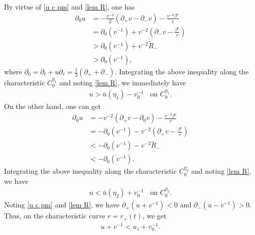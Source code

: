 \documentclass[10pt,leqno]{amsart}
\numberwithin{equation}{section}
\begin{document}
	By virtue of \eqref{u c pm} and \eqref{lem R}, one has
	\begin{equation} 
		\begin{aligned}
			\partial_{0} u &= - \frac{v^{-2}}{2}(\partial_{+} v - \partial_{-} v) - \frac{v^{-2} \mathcal{F}}{r}  \\
			& = \partial_{0} (v^{-1}) + v^{-2}\left( \partial_{-} v - \frac{\mathcal{F}}{r} \right) \\
			& > \partial_{0} (v^{-1}) + v^{-2} \tilde{R}_- \\
			& > \partial_{0} (v^{-1}),
		\end{aligned}
	\end{equation}	
	where $\partial_{0}  = \partial_{t} + u \partial_{r} = \frac{1}{2} (\partial_{+} + \partial_{-} )$. Integrating the above inequality along the characteristic $C_{0}^{\eta_1}$ and noting \eqref{lem R}, we immediately have
	\begin{equation} \label{3.12}
		\begin{aligned}
			u > \bar{u} (\eta_1) - v_{0}^{-1} \ \ \ \ \text{on } C_{0}^{\eta_1}.
		\end{aligned}
	\end{equation}	
	On the other hand, one can get
	\begin{equation} 
		\begin{aligned}
			\partial_{0} u & = - v^{-2}(\partial_{+} v - \partial_{0} v) -\frac{ v^{-2}\mathcal{F}}{r} \\
			& = -\partial_{0} (v^{-1}) - v^{-2}\left( \partial_{+} v - \frac{\mathcal{F}}{r} \right) \\
			& < - \partial_{0} (v^{-1}) - v^{-2} \tilde{R}_- \\
			& < - \partial_{0} (v^{-1}).
		\end{aligned}
	\end{equation}	
	Integrating the above inequality along the characteristic $C_{0}^{\eta_2}$ and noting \eqref{lem R}, we have
	\begin{equation} \label{3.14}
		\begin{aligned}
			u < \bar{u} (\eta_2) + v_{0}^{-1} \ \ \ \ \text{on } C_{0}^{\eta_2}.
		\end{aligned}
	\end{equation}	
	Noting \eqref{u c pm} and \eqref{lem R}, we have $ \partial_{+}(u+v^{-1}) < 0 $ and $ \partial_{-}(u-v^{-1}) > 0 $. Thus, on the characteristic curve $r=r_{+}(t)$, we get
	\begin{equation} \label{3.15 1}
		\begin{aligned}
			u+v^{-1}<u_1+v^{-1}_0 .		 
		\end{aligned}
	\end{equation}
\end{document}
